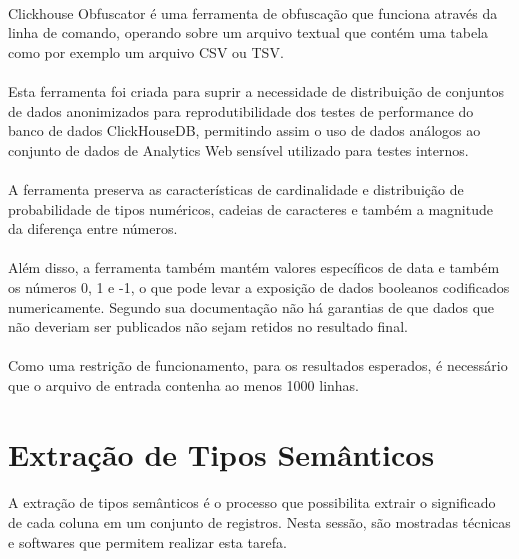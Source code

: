 \paragraph{} Clickhouse Obfuscator\cite{clickhouse-obfuscator} é uma ferramenta de obfuscação que funciona através da linha de comando, operando sobre um arquivo textual que contém uma tabela como por exemplo um arquivo CSV ou TSV.

\paragraph{} Esta ferramenta foi criada para suprir a necessidade de distribuição de conjuntos de dados anonimizados para reprodutibilidade dos testes de performance do banco de dados ClickHouseDB, permitindo assim o uso de dados análogos ao conjunto de dados de Analytics Web sensível utilizado para testes internos.

\paragraph{} A ferramenta preserva as características de cardinalidade e distribuição de probabilidade de tipos numéricos, cadeias de caracteres e também a magnitude da diferença entre números.

\paragraph{} Além disso, a ferramenta também mantém valores específicos de data e também os números 0, 1 e -1, o que pode levar a exposição de dados booleanos codificados numericamente. Segundo sua documentação não há garantias de que dados que não deveriam ser publicados não sejam retidos no resultado final.

\paragraph{} Como uma restrição de funcionamento, para os resultados esperados, é necessário que o arquivo de entrada contenha ao menos 1000 linhas.


\section{Extração de Tipos Semânticos}

\paragraph{} A extração de tipos semânticos é o processo que possibilita extrair o significado de cada coluna em um conjunto de registros.
Nesta sessão, são mostradas técnicas e softwares que permitem realizar esta tarefa.

